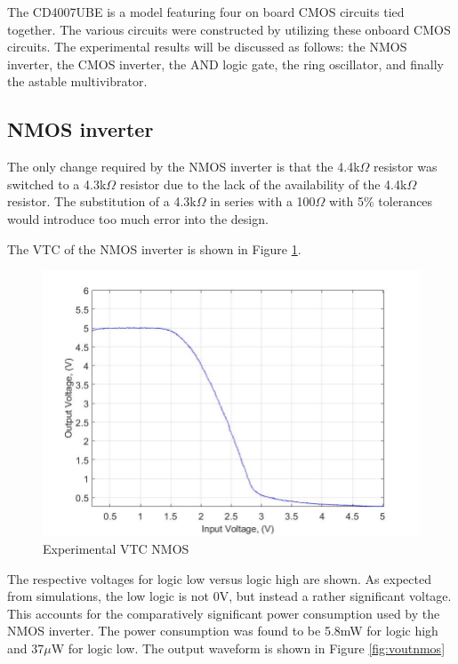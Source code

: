 
The CD4007UBE is a model featuring four on board CMOS circuits tied together. The various circuits were constructed by utilizing these onboard CMOS circuits. The experimental results will be discussed as follows: the NMOS inverter, the CMOS inverter, the AND logic gate, the ring oscillator, and finally the astable multivibrator. 

\subsection{NMOS inverter}
The only change required by the NMOS inverter is that the 4.4k$\Omega$ resistor was switched to a 4.3k$\Omega$ resistor due to the lack of the availability of the 4.4k$\Omega$ resistor. The substitution of a 4.3k$\Omega$ in series with a 100$\Omega$ with 5\% tolerances would introduce too much error into the design. 
\newline

The VTC of the NMOS inverter is shown in Figure \ref{fig:VTCnmosexp}.

\begin{figure}[H]
    \centering
        \centering
        \includegraphics[scale = .35]{ExperimentalImplementation/VTC_NMOS_EXP.jpg}
        \caption{Experimental VTC NMOS}
        \label{fig:VTCnmosexp}
\end{figure} 
 The respective voltages for logic low versus logic high are shown. As expected from simulations, the low logic is not 0V, but instead a rather significant voltage. This accounts for the comparatively significant power consumption used by the NMOS inverter. The power consumption was found to be 5.8mW for logic high and 37$\mu$W for logic low. The output waveform is shown in Figure \ref{fig:voutnmos}
 
